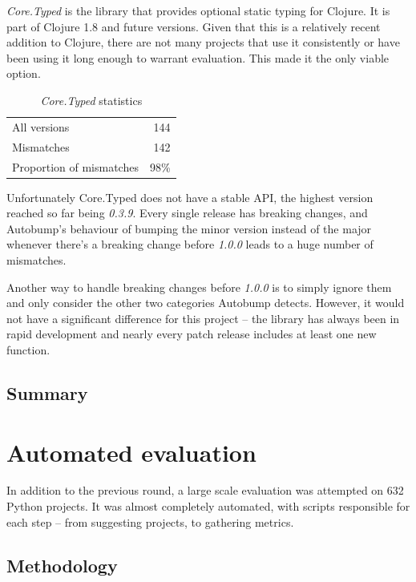 \documentclass{l4proj}
\begin{document}
\textit{Core.Typed} is the library that provides optional static
typing for Clojure. It is part of Clojure 1.8 and future versions.
Given that this is a relatively recent addition to Clojure, there are
not many projects that use it consistently or have been using it long
enough to warrant evaluation. This made it the only viable option.

\begin{table}
\centering
\caption{\textit{Core.Typed} statistics}
\label{CoreTypedStats}
\begin{tabular}{|lr|}
All versions & 144 \\
Mismatches & 142 \\
Proportion of mismatches & 98\% \\
\end{tabular}
\end{table}

Unfortunately Core.Typed does not have a stable API, the highest
version reached so far being \textit{0.3.9}. Every single release has
breaking changes, and Autobump's behaviour of bumping the minor
version instead of the major whenever there's a breaking change before
\textit{1.0.0} leads to a huge number of mismatches.

Another way to handle breaking changes before \textit{1.0.0} is to
simply ignore them and only consider the other two categories Autobump
detects. However, it would not have a significant difference for this
project -- the library has always been in rapid development and nearly
every patch release includes at least one new function.

\subsection{Summary}


\section{Automated evaluation}

In addition to the previous round, a large scale evaluation was
attempted on 632 Python projects. It was almost completely automated,
with scripts responsible for each step -- from suggesting projects, to
gathering metrics.

\subsection{Methodology}
\end{document}
